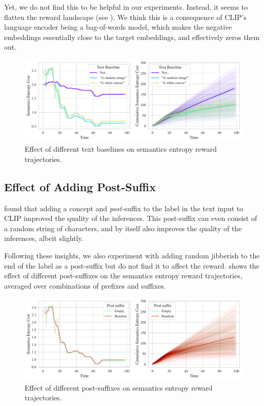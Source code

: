 Yet, we do not find this to be helpful in our experiments.
Instead, it seems to flatten the reward landscape (see ).
We think this is a consequence of CLIP's language encoder being a bag-of-words model, which makes the negative embeddings essentially close to the target embeddings, and effectively zeros them out.

\begin{figure}[h]
    \centering
    \includegraphics[width=\textwidth]{images/baseline_comparison.pdf}
    \caption{Effect of different text baselines on semantics entropy reward trajectories.}
    \label{fig:baseline}
\end{figure}

\subsection{Effect of Adding Post-Suffix}
\label{sec:post-suffix}
\cite{waffleclip} found that adding a concept and \emph{post-}suffix to the label in the text input to CLIP improved the quality of the inferences.
This post-suffix can even consist of a random string of characters, and by itself also improves the quality of the inferences, albeit slightly.

Following these insights, we also experiment with adding random jibberish to the end of the label as a post-suffix but do not find it to affect the reward.
 shows the effect of different post-suffixes on the semantics entropy reward trajectories, averaged over combinations of prefixes and suffixes.

\begin{figure}[H]
    \centering
    \includegraphics[width=\textwidth]{images/post_suffix_comparison.pdf}
    \caption{Effect of different post-suffixes on semantics entropy reward trajectories.}
    \label{fig:post-suffix}
\end{figure}

